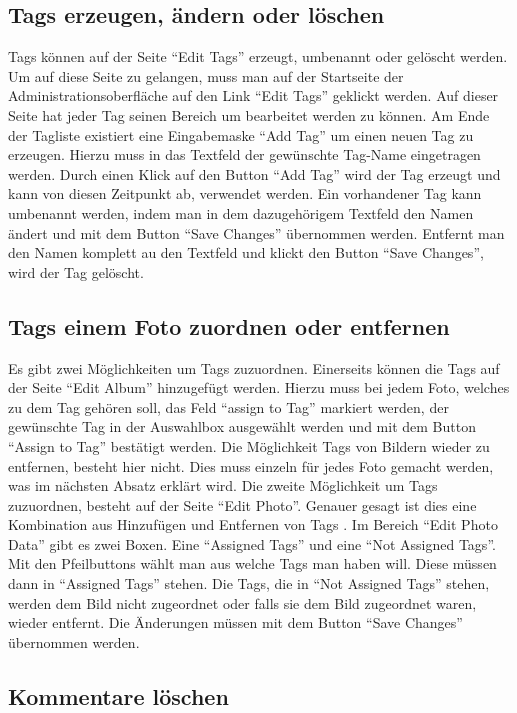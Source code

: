 \documentclass[a4paper,12pt,liststotocnumbered]{scrartcl}
\begin{document}
\subsection{Tags erzeugen, ändern oder löschen}

Tags können auf der Seite "`Edit Tags"' erzeugt, umbenannt oder gelöscht
werden.  Um auf diese Seite zu gelangen, muss man auf der Startseite der
Administrationsoberfläche auf den Link "`Edit Tags"' geklickt werden.
Auf dieser Seite hat jeder Tag seinen Bereich um bearbeitet werden zu
können. Am Ende der Tagliste existiert eine Eingabemaske "`Add Tag"' um
einen neuen Tag zu erzeugen. Hierzu muss in das Textfeld der gewünschte
Tag-Name eingetragen werden.  Durch einen Klick auf den Button "`Add
Tag"' wird der Tag erzeugt und kann von diesen Zeitpunkt ab, verwendet
werden. Ein vorhandener Tag kann umbenannt werden, indem man in dem
dazugehörigem Textfeld den Namen ändert und mit dem Button "`Save
Changes"' übernommen werden. Entfernt man den Namen komplett au den
Textfeld und klickt den Button "`Save Changes"', wird der Tag gelöscht.

\subsection{Tags einem Foto zuordnen oder entfernen}

Es gibt zwei Möglichkeiten um Tags zuzuordnen. Einerseits können die
Tags auf der Seite "`Edit Album"' hinzugefügt werden. Hierzu muss bei
jedem Foto, welches zu dem Tag gehören soll, das Feld "`assign to Tag"'
markiert werden, der gewünschte Tag in der Auswahlbox ausgewählt werden
und mit dem Button "`Assign to Tag"' bestätigt werden.  Die Möglichkeit
Tags von Bildern wieder zu entfernen, besteht hier nicht. Dies muss
einzeln für jedes Foto gemacht werden, was im nächsten Absatz erklärt
wird.  Die zweite Möglichkeit um Tags zuzuordnen, besteht auf der Seite
"`Edit Photo"'. Genauer gesagt ist dies eine Kombination aus Hinzufügen
und Entfernen von Tags .  Im Bereich "`Edit Photo Data"' gibt es zwei
Boxen. Eine "`Assigned Tags"' und eine "`Not Assigned Tags"'. Mit den
Pfeilbuttons wählt man aus welche Tags man haben will. Diese müssen dann
in "`Assigned Tags"' stehen. Die Tags, die in "`Not Assigned Tags"'
stehen, werden dem Bild nicht zugeordnet oder falls sie dem Bild
zugeordnet waren, wieder entfernt.  Die Änderungen müssen mit dem Button
"`Save Changes"' übernommen werden.

\subsection{Kommentare löschen}
\end{document}
